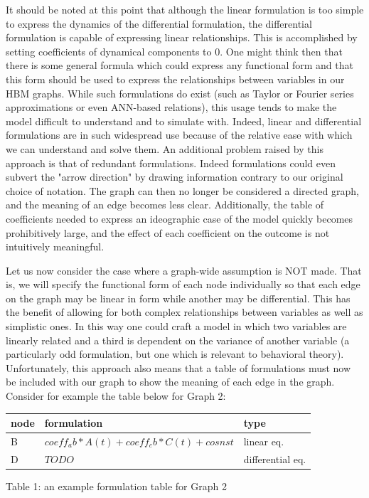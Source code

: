 \documentclass[conference]{IEEEtran}
\begin{document}
It should be noted at this point that although the linear formulation is too simple to express the dynamics of the differential formulation, the differential formulation is capable of expressing linear relationships.
This is accomplished by setting coefficients of dynamical components to 0.
One might think then that there is some general formula which could express any functional form and that this form should be used to express the relationships between variables in our HBM graphs.
While such formulations do exist (such as Taylor or Fourier series approximations or even ANN-based relations), this usage tends to make the model difficult to understand and to simulate with.
Indeed, linear and differential formulations are in such widespread use because of the relative ease with which we can understand and solve them. An additional problem raised by this approach is that of redundant formulations.
Indeed formulations could even subvert the "arrow direction" by drawing information contrary to our original choice of notation.
The graph can then no longer be considered a directed graph, and the meaning of an edge becomes less clear.
Additionally, the table of coefficients needed to express an ideographic case of the model quickly becomes prohibitively large, and the effect of each coefficient on the outcome is not intuitively meaningful.

Let us now consider the case where a graph-wide assumption is NOT made.
That is, we will specify the functional form of each node individually so that each edge on the graph may be linear in form while another may be differential.
This has the benefit of allowing for both complex relationships between variables as well as simplistic ones.
In this way one could craft a model in which two variables are linearly related and a third is dependent on the variance of another variable (a particularly odd formulation, but one which is relevant to behavioral theory).
Unfortunately, this approach also means that a table of formulations must now be included with our graph to show the meaning of each edge in the graph.
Consider for example the table below for Graph 2:

\begin{centering}
\begin{tabular}{ | l | l | l |}
    \hline
    node & formulation & type \\ \hline
    B & $coeff_ab*A(t) + coeff_cb*C(t) + cosnst$ & linear eq. \\ \hline
    D & $ TODO $ & differential eq. \\ \hline
\end{tabular}
Table 1: an example formulation table for Graph 2 
\end{centering}
\end{document}
